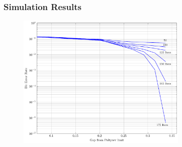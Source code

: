 \documentclass[10pt]{beamer}
\begin{document}
\begin{frame}
\begin{figure}
\begin{center}
        \end{center}
    \end{figure}
\end{frame}

\begin{frame}\frametitle{Simulation Results}

\begin{figure}
\begin{center}
\includegraphics[width=3.2in]{BER_iters_4_72_9.pdf}
\end{center}
\end{figure}
\end{frame}
\end{document}
